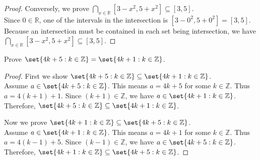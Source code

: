 \documentclass[DIN, pagenumber=false, fontsize=11pt, parskip=half]{scrartcl}
\begin{document}
\begin{problems}
\begin{proof}
        Conversely, we prove $\bigcap\limits_{x\in\mathbb{R}}[3-x^2,5+x^2] \subseteq [3,5]$.\\ 
        Since $0 \in \mathbb{R}$, one of the intervals in the intersection is $[3-0^2, 5+0^2] = [3,5]$.
    Because an intersection must be contained in each set being intersection, we have $\bigcap\limits_{x\in\mathbb{R}}[3-x^2,5+x^2] \subseteq [3,5]$.
    \end{proof}

    \problem Prove $\set{4k + 5 : k \in \mathbb{Z}} = \set{4k+1 : k \in \mathbb{Z}}$.
    \begin{proof}
        First we show $\set{4k+5 : k \in \mathbb{Z}} \subseteq \set{4k+1 : k \in \mathbb{Z}}$.\\ 
        Assume $a \in \set{4k+5 : k \in \mathbb{Z}}$.
        This means $a = 4k + 5$ for some $k \in \mathbb{Z}$.
        Thus $a = 4(k+1) + 1$.
        Since $(k+1) \in \mathbb{Z}$, we have $a \in \set{4k+1 : k \in \mathbb{Z}}$.
        Therefore, $\set{4k+5 : k \in \mathbb{Z}} \subseteq \set{4k+1 : k \in \mathbb{Z}}$.

        Now we prove $\set{4k+1 : k \in \mathbb{Z}} \subseteq \set{4k+5 : k \in \mathbb{Z}}$.\\ 
        Assume $a \in \set{4k+1 : k \in \mathbb{Z}}$.
        This means $a = 4k+1$ for some $k \in \mathbb{Z}$.
        Thus $a = 4(k-1)+5$.
        Since $(k-1) \in \mathbb{Z}$, we have $a \in \set{4k+5 : k \in \mathbb{Z}}$.
        Therefore, $\set{4k+1 : k \in \mathbb{Z}} \subseteq \set{4k+5 : k \in \mathbb{Z}}$.

    \end{proof}

\end{problems}
\end{document}
